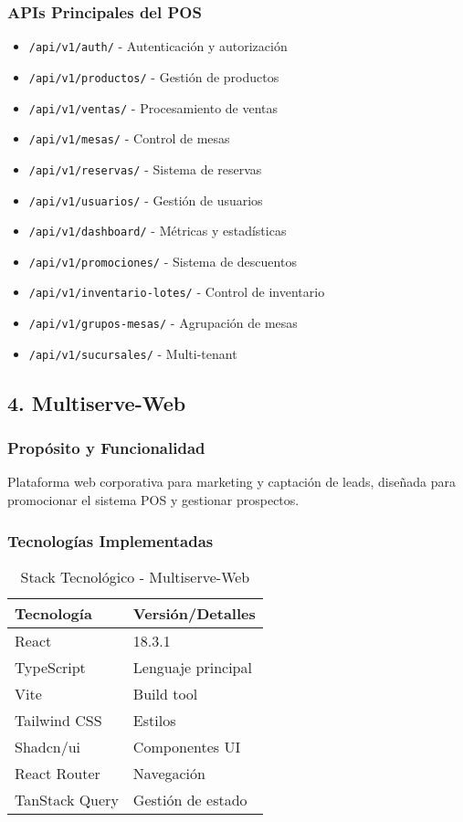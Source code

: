 \documentclass[12pt,a4paper]{article}
\begin{document}
\subsubsection{APIs Principales del POS}
\begin{itemize}
    \item \texttt{/api/v1/auth/} - Autenticación y autorización
    \item \texttt{/api/v1/productos/} - Gestión de productos
    \item \texttt{/api/v1/ventas/} - Procesamiento de ventas
    \item \texttt{/api/v1/mesas/} - Control de mesas
    \item \texttt{/api/v1/reservas/} - Sistema de reservas
    \item \texttt{/api/v1/usuarios/} - Gestión de usuarios
    \item \texttt{/api/v1/dashboard/} - Métricas y estadísticas
    \item \texttt{/api/v1/promociones/} - Sistema de descuentos
    \item \texttt{/api/v1/inventario-lotes/} - Control de inventario
    \item \texttt{/api/v1/grupos-mesas/} - Agrupación de mesas
    \item \texttt{/api/v1/sucursales/} - Multi-tenant
\end{itemize}

\subsection{4. Multiserve-Web}

\subsubsection{Propósito y Funcionalidad}
Plataforma web corporativa para marketing y captación de leads, diseñada para promocionar el sistema POS y gestionar prospectos.

\subsubsection{Tecnologías Implementadas}
\begin{table}[H]
\centering
\begin{tabular}{@{}ll@{}}
\toprule
\textbf{Tecnología} & \textbf{Versión/Detalles} \\
\midrule
React & 18.3.1 \\
TypeScript & Lenguaje principal \\
Vite & Build tool \\
Tailwind CSS & Estilos \\
Shadcn/ui & Componentes UI \\
React Router & Navegación \\
TanStack Query & Gestión de estado \\
\bottomrule
\end{tabular}
\caption{Stack Tecnológico - Multiserve-Web}
\end{table}
\end{document}
